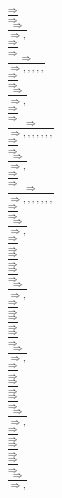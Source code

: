 \documentclass[11pt]{article}
\begin{document}
\begin{center}
\bigskip
\\$\frac{\Rightarrow }{\Rightarrow }$
\bigskip
\\$\frac{\Rightarrow }{\Rightarrow , }$
\bigskip
\\$\frac{\Rightarrow }{\Rightarrow }$
\bigskip
\\$\frac{\Rightarrow }{\Rightarrow , , , , , }$
\bigskip
\\$\frac{\Rightarrow }{\Rightarrow }$
\bigskip
\\$\frac{\Rightarrow }{\Rightarrow , }$
\bigskip
\\$\frac{\Rightarrow }{\Rightarrow }$
\bigskip
\\$\frac{\Rightarrow }{\Rightarrow , , , , , , , }$
\bigskip
\\$\frac{\Rightarrow }{\Rightarrow }$
\bigskip
\\$\frac{\Rightarrow }{\Rightarrow , }$
\bigskip
\\$\frac{\Rightarrow }{\Rightarrow }$
\bigskip
\\$\frac{\Rightarrow }{\Rightarrow , , , , , , , }$
\bigskip
\\$\frac{\Rightarrow }{\Rightarrow }$
\bigskip
\\$\frac{\Rightarrow }{\Rightarrow , }$
\bigskip
\\$\frac{\Rightarrow }{\Rightarrow }$
\bigskip
\\$\frac{\Rightarrow }{\Rightarrow }$
\bigskip
\\$\frac{\Rightarrow }{\Rightarrow }$
\bigskip
\\$\frac{\Rightarrow }{\Rightarrow , }$
\bigskip
\\$\frac{\Rightarrow }{\Rightarrow }$
\bigskip
\\$\frac{\Rightarrow }{\Rightarrow }$
\bigskip
\\$\frac{\Rightarrow }{\Rightarrow }$
\bigskip
\\$\frac{\Rightarrow }{\Rightarrow , }$
\bigskip
\\$\frac{\Rightarrow }{\Rightarrow }$
\bigskip
\\$\frac{\Rightarrow }{\Rightarrow }$
\bigskip
\\$\frac{\Rightarrow }{\Rightarrow }$
\bigskip
\\$\frac{\Rightarrow }{\Rightarrow , }$
\bigskip
\\$\frac{\Rightarrow }{\Rightarrow }$
\bigskip
\\$\frac{\Rightarrow }{\Rightarrow }$
\bigskip
\\$\frac{\Rightarrow }{\Rightarrow }$
\bigskip
\\$\frac{\Rightarrow }{\Rightarrow , }$

\end{center}
\end{document}
